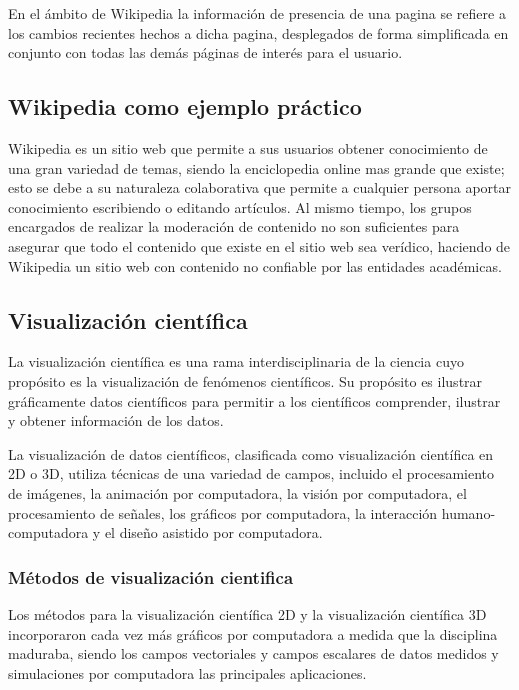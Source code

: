         En el ámbito de Wikipedia la información de presencia de una pagina se refiere a los cambios recientes hechos a dicha pagina, desplegados de forma simplificada en conjunto con todas las demás páginas de interés para el usuario.
       
    \subsection{Wikipedia como ejemplo práctico}

        Wikipedia es un sitio web que permite a sus usuarios obtener conocimiento de una gran variedad de temas, siendo la enciclopedia online mas grande que existe; esto se debe a su naturaleza colaborativa que permite a cualquier persona aportar conocimiento escribiendo o editando artículos. Al mismo tiempo, los grupos encargados de realizar la moderación de contenido no son suficientes para asegurar que todo el contenido que existe en el sitio web sea verídico, haciendo de Wikipedia un sitio web con contenido no confiable por las entidades académicas.

    \subsection{Visualización científica}

        La visualización científica es una rama interdisciplinaria de la ciencia cuyo propósito es la visualización de fenómenos científicos. Su propósito es ilustrar gráficamente datos científicos para permitir a los científicos comprender, ilustrar y obtener información de los datos.

        La visualización de datos científicos, clasificada como visualización científica en 2D o 3D, utiliza técnicas de una variedad de campos, incluido el procesamiento de imágenes, la animación por computadora, la visión por computadora, el procesamiento de señales, los gráficos por computadora, la interacción humano-computadora y el diseño asistido por computadora.


    \subsubsection{Métodos de visualización cientifica}

        Los métodos para la visualización científica 2D y la visualización científica 3D incorporaron cada vez más gráficos por computadora a medida que la disciplina maduraba, siendo los campos vectoriales y campos escalares de datos medidos y simulaciones por computadora las principales aplicaciones.

